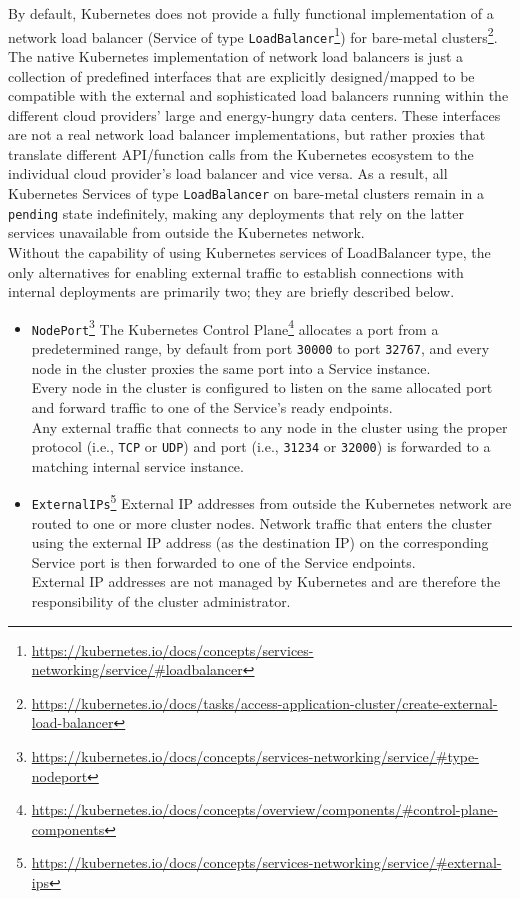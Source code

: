 By default, Kubernetes does not provide a fully functional implementation of a network
load balancer (Service of type \texttt{LoadBalancer}\footnote{\url{https://kubernetes.io/docs/concepts/services-networking/service/\#loadbalancer}})
for bare-metal clusters\footnote{\url{https://kubernetes.io/docs/tasks/access-application-cluster/create-external-load-balancer}}.
The native Kubernetes implementation of network load balancers is just a collection
of predefined interfaces that are explicitly designed/mapped to be compatible with
the external and sophisticated load balancers running within the different cloud
providers' large and energy-hungry data centers. These interfaces are not a real
network load balancer implementations, but rather proxies that translate
different API/function calls from the Kubernetes ecosystem to the individual
cloud provider's load balancer and vice versa. As a result, all Kubernetes
Services of type \texttt{LoadBalancer} on bare-metal clusters remain in a \texttt{pending}
state indefinitely, making any deployments that rely on the latter services unavailable
from outside the Kubernetes network. \\ %
Without the capability of using Kubernetes services of LoadBalancer type, the
only alternatives for enabling external traffic to establish connections with
internal deployments are primarily two; they are briefly described below.
\begin{itemize}
  \item \texttt{NodePort}\footnote{\url{https://kubernetes.io/docs/concepts/services-networking/service/\#type-nodeport}}
    \newline
    The Kubernetes Control Plane\footnote{\url{https://kubernetes.io/docs/concepts/overview/components/\#control-plane-components}}
    allocates a port from a predetermined range, by default from port \texttt{30000}
    to port \texttt{32767}, and every node in the cluster proxies the same port
    into a Service instance. \\ %
    Every node in the cluster is configured to listen on the same allocated port
    and forward traffic to one of the Service's ready endpoints. \\ %
    Any external traffic that connects to any node in the cluster using the
    proper protocol (i.e., \texttt{TCP} or \texttt{UDP}) and port (i.e., \texttt{31234}
    or \texttt{32000}) is forwarded to a matching internal service instance.

  \item \texttt{ExternalIPs}\footnote{\url{https://kubernetes.io/docs/concepts/services-networking/service/\#external-ips}}
    \newline
    External IP addresses from outside the Kubernetes network are routed to one
    or more cluster nodes. Network traffic that enters the cluster using the external
    IP address (as the destination IP) on the corresponding Service port is then
    forwarded to one of the Service endpoints. \\ %
    External IP addresses are not managed by Kubernetes and are therefore the responsibility
    of the cluster administrator.
\end{itemize}

